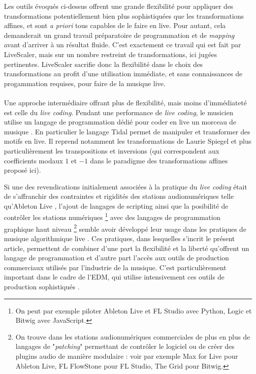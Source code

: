 \documentclass{article}
\begin{document}
Les outils évoqués ci-dessus offrent une grande flexibilité pour appliquer des transformations potentiellement bien plus sophistiquées que les transformations affines, et sont \emph{a priori} tous capables de le faire en live. Pour autant, cela demanderait un grand travail préparatoire de programmation et de \emph{mapping} avant d'arriver à un résultat fluide. C'est exactement ce travail qui est fait par LiveScaler, mais sur un nombre restreint de transformations, ici jugées pertinentes. LiveScaler sacrifie donc la flexibilité dans le choix des transformations au profit d'une utilisation immédiate, et sans connaissances de progammation requises, pour faire de la musique live.

\paragraph*{}

Une approche intermédiaire offrant plus de flexibilité, mais moins d'immédiateté est celle du \emph{live coding}. Pendant une performance de \emph{live coding}, le musicien utilise un langage de programmation dédié pour coder en live un morceau de musique \cite{blackwell2022live}. En particulier le langage Tidal \cite{mclean2010tidal} permet de manipuler et transformer des motifs en live. Il reprend notamment les transformations de Laurie Spiegel \cite{spiegel1981manipulations} et plus particulièrement les transpositions et inversions (qui correspondent aux coefficients modaux $1$ et $-1$ dans le paradigme des transformations affines proposé ici).

Si une des revendications initialement associées à la pratique du \emph{live coding} était de s'affranchir des contraintes et rigidités des stations audionumériques telle qu'Ableton Live \cite{collins2003live}, l'ajout de langages de scripting  ainsi que la posibilité de contrôler les stations numériques \footnote{On peut par exemple piloter  Ableton Live et FL Studio avec Python, Logic et Bitwig avec JavaScript.} avec des langages de programmation graphique haut niveau \footnote{On trouve dans les stations audionumériques commerciales de plus en plus de langages de "\emph{patching}" permettant de contrôler le logiciel ou de créer des plugins audio de manière modulaire : voir par exemple Max for Live pour Ableton Live, FL FlowStone pour FL Studio, The Grid pour Bitwig.} semble avoir développé leur usage dans les pratiques de musique algorithmique live \cite{collins2014algorave}. Ces pratiques, dans lesquelles s'incrit le présent article, permettent de combiner d'une part la flexibilité et la liberté qu'offrent un langage de programmation et d'autre part l'accès aux outils de production commerciaux utilisés par l'industrie de la musique. C'est particulièrement important dans le cadre de l'EDM, qui utilise intensivement ces outils de production sophistiqués \cite{fraser2012spaces}.
\end{document}

